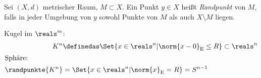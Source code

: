 \begin{definition}
    Sei \( (X,d) \) metrischer Raum, \( M\subset X \). Ein Punkt \( y\in X \) heißt \emph{Randpunkt} von \( M \), falls in jeder Umgebung von \( y \) sowohl Punkte von \( M \) als auch \( X\setminus M \) liegen.
\end{definition}
\begin{beispiel*}
   Kugel im \( \reals^m \):
   \begin{align*}
       K^n&\definedas \Set{x\in \reals^n| \norm{x-0}_\text{E}\leq R}\subset \reals^n\\
       \intertext{Sphäre:}
       \randpunkte{K^n} &=\Set{x\in \reals^n|\norm{x}_\text{E}= R}=S^{n-1}
   \end{align*} 
\end{beispiel*}

